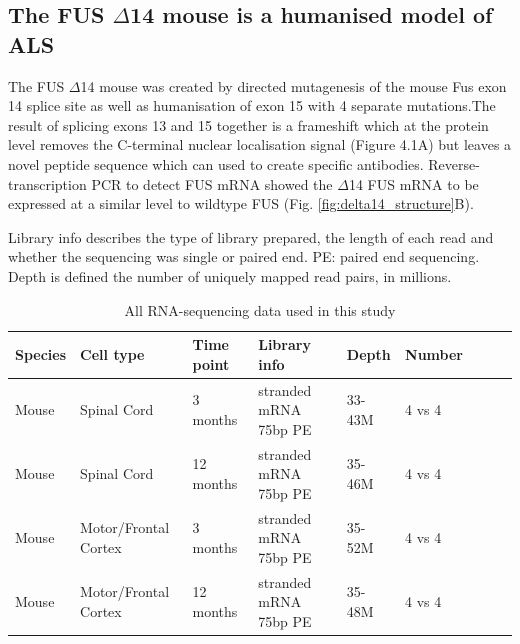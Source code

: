 \subsection{The FUS $\Delta$14 mouse is a humanised model of ALS}
The FUS $\Delta$14 mouse was created by directed mutagenesis of the mouse Fus exon 14 splice site as well as humanisation of exon 15 with 4 separate mutations.The result of splicing exons 13 and 15 together is a frameshift which at the protein level removes the C-terminal nuclear localisation signal (Figure 4.1A) but leaves a novel peptide sequence which can used to create specific antibodies. Reverse-transcription PCR to detect FUS mRNA showed the $\Delta$14 FUS mRNA to be expressed at a similar level to wildtype FUS (Fig. \ref{fig:delta14_structure}B). 


\begin{table}[h!]
	\caption{All RNA-sequencing data used in this study}
	Library info describes the type of library prepared, the length of each read and whether the sequencing was single or paired end. PE: paired end sequencing. Depth is defined the number of uniquely mapped read pairs, in millions.
	\begin{center}
		\begin{small}
			\begin{tabular}{llllp{1.5cm}llll}
				Species & Cell type & Time point & Library info & Depth & Number\\
				\hline
				Mouse & Spinal Cord & 3 months & stranded mRNA 75bp PE & 33-43M & 4 vs 4\\
				Mouse & Spinal Cord & 12 months & stranded mRNA 75bp PE & 35-46M & 4 vs 4\\ 
				Mouse & Motor/Frontal Cortex & 3 months & stranded mRNA 75bp PE & 35-52M & 4 vs 4\\
				Mouse & Motor/Frontal Cortex & 12 months & stranded mRNA 75bp PE & 35-48M & 4 vs 4\\ 
			\end{tabular}
		\end{small}
	\end{center}
\end{table}

